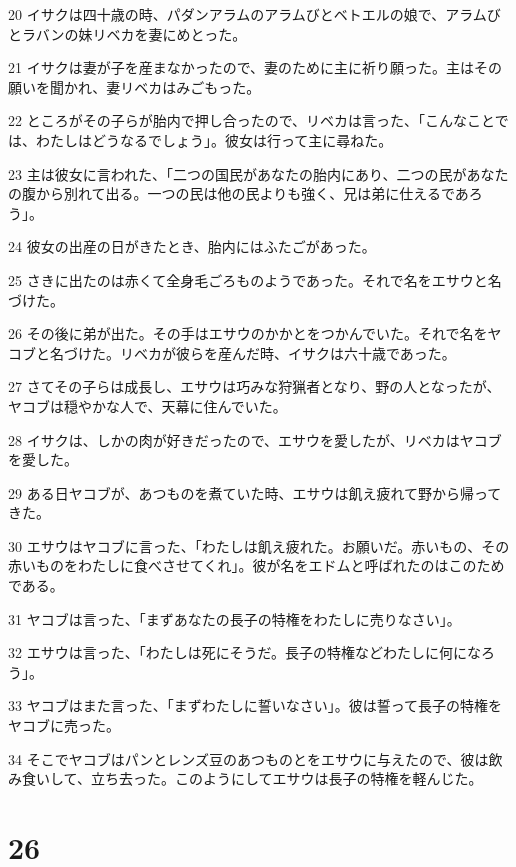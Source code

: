 \par 20 イサクは四十歳の時、パダンアラムのアラムびとベトエルの娘で、アラムびとラバンの妹リベカを妻にめとった。
\par 21 イサクは妻が子を産まなかったので、妻のために主に祈り願った。主はその願いを聞かれ、妻リベカはみごもった。
\par 22 ところがその子らが胎内で押し合ったので、リベカは言った、「こんなことでは、わたしはどうなるでしょう」。彼女は行って主に尋ねた。
\par 23 主は彼女に言われた、「二つの国民があなたの胎内にあり、二つの民があなたの腹から別れて出る。一つの民は他の民よりも強く、兄は弟に仕えるであろう」。
\par 24 彼女の出産の日がきたとき、胎内にはふたごがあった。
\par 25 さきに出たのは赤くて全身毛ごろものようであった。それで名をエサウと名づけた。
\par 26 その後に弟が出た。その手はエサウのかかとをつかんでいた。それで名をヤコブと名づけた。リベカが彼らを産んだ時、イサクは六十歳であった。
\par 27 さてその子らは成長し、エサウは巧みな狩猟者となり、野の人となったが、ヤコブは穏やかな人で、天幕に住んでいた。
\par 28 イサクは、しかの肉が好きだったので、エサウを愛したが、リベカはヤコブを愛した。
\par 29 ある日ヤコブが、あつものを煮ていた時、エサウは飢え疲れて野から帰ってきた。
\par 30 エサウはヤコブに言った、「わたしは飢え疲れた。お願いだ。赤いもの、その赤いものをわたしに食べさせてくれ」。彼が名をエドムと呼ばれたのはこのためである。
\par 31 ヤコブは言った、「まずあなたの長子の特権をわたしに売りなさい」。
\par 32 エサウは言った、「わたしは死にそうだ。長子の特権などわたしに何になろう」。
\par 33 ヤコブはまた言った、「まずわたしに誓いなさい」。彼は誓って長子の特権をヤコブに売った。
\par 34 そこでヤコブはパンとレンズ豆のあつものとをエサウに与えたので、彼は飲み食いして、立ち去った。このようにしてエサウは長子の特権を軽んじた。

\chapter{26}

